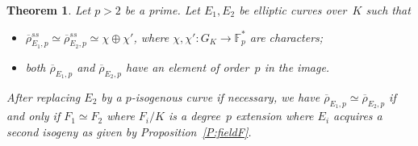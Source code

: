 \documentclass[12pt]{amsart}
\newcommand{\F}{\mathbb{F}}
\newcommand{\rhobar}{{\overline{\rho}}}
\numberwithin{equation}{section}
\newtheorem{theorem}{Theorem}[section]
\theoremstyle{definition}
\theoremstyle{remark}
\begin{document}
\begin{theorem} \label{T:reducible}
Let $p > 2$ be a prime. Let $E_1, E_2$ be elliptic curves 
over~$K$ such that 
\begin{itemize}
 \item[(i)] $\rhobar_{E_1,p}^{ss} \simeq \rhobar_{E_2,p}^{ss} \simeq \chi \oplus \chi'$,  where $\chi, \chi' : G_K \to \F_p^*$ are characters;
 \item[(ii)] both $\rhobar_{E_1,p}$ and $\rhobar_{E_2,p}$ have an element of
 order~$p$ in the image.
\end{itemize}
After replacing $E_2$ by a $p$-isogenous curve if necessary, we have 
$\rhobar_{E_1,p} \simeq \rhobar_{E_2,p}$ 
if and only if $F_1 \simeq F_2$
where $F_i/K$ is a degree~$p$ extension where $E_i$ acquires a second isogeny
as given by Proposition~\ref{P:fieldF}.
\end{theorem}
\end{document}
